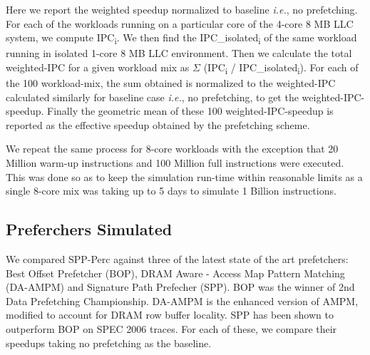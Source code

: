 \documentclass{sig-alternate}
\begin{document}
Here we report the weighted speedup normalized to baseline \textit{i.e.}, no prefetching. 
For each of the workloads running on a particular core of the 4-core 8 MB LLC system, we compute IPC\textsubscript{i}. 
We then find the IPC\_isolated\textsubscript{i} of the same workload running in isolated 1-core 8 MB LLC environment. 
Then we calculate the total weighted-IPC for a given workload mix as $\Sigma$ (IPC\textsubscript{i} / IPC\_isolated\textsubscript{i}). 
For each of the 100 workload-mix, the sum obtained is normalized to the weighted-IPC calculated similarly for baseline case \textit{i.e.}, no prefetching, to get the weighted-IPC-speedup. 
Finally the geometric mean of these 100 weighted-IPC-speedup is reported as the effective speedup obtained by the prefetching scheme.

We repeat the same process for 8-core workloads with the exception that 20 Million warm-up instructions and 100 Million full instructions were executed.
This was done so as to keep the simulation run-time within reasonable limits as a single 8-core mix was taking up to 5 days to simulate 1 Billion instructions.

\subsection{Preferchers Simulated}
We compared SPP-Perc against three of the latest state of the art prefetchers: Best Offset Prefetcher (BOP), DRAM Aware - Access Map Pattern Matching (DA-AMPM)\cite{DA_AMPM} and Signature Path Prefecher (SPP). 
BOP was the winner of 2nd Data Prefetching Championship. 
DA-AMPM is the enhanced version of AMPM, modified to account for DRAM row buffer locality. 
SPP has been shown to outperform BOP on SPEC 2006 traces. 
For each of these, we compare their speedups taking no prefetching as the baseline.
\end{document}
